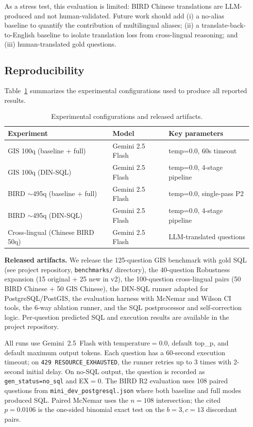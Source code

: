 \documentclass[11pt]{article}
\begin{document}
As a stress test, this evaluation is limited: BIRD Chinese translations are LLM-produced and not human-validated. Future work should add (i) a no-alias baseline to quantify the contribution of multilingual aliases; (ii) a translate-back-to-English baseline to isolate translation loss from cross-lingual reasoning; and (iii) human-translated gold questions.

\subsection{Reproducibility}

Table~\ref{tab:repro} summarizes the experimental configurations used to produce all reported results.

\begin{table}[t]
\centering
\caption{Experimental configurations and released artifacts.}
\label{tab:repro}
\begin{tabular}{lll}
\toprule
Experiment & Model & Key parameters \\
\midrule
GIS 100q (baseline + full) & Gemini 2.5 Flash & temp=0.0, 60s timeout \\
GIS 100q (DIN-SQL) & Gemini 2.5 Flash & temp=0.0, 4-stage pipeline \\
BIRD $\sim$495q (baseline + full) & Gemini 2.5 Flash & temp=0.0, single-pass P2 \\
BIRD $\sim$495q (DIN-SQL) & Gemini 2.5 Flash & temp=0.0, 4-stage pipeline \\
Cross-lingual (Chinese BIRD 50q) & Gemini 2.5 Flash & LLM-translated questions \\
\bottomrule
\end{tabular}
\end{table}

\noindent\textbf{Released artifacts.} We release the 125-question GIS benchmark with gold SQL (see project repository, \texttt{benchmarks/} directory), the 40-question Robustness expansion (15 original + 25 new in v2), the 100-question cross-lingual pairs (50 BIRD Chinese + 50 GIS Chinese), the DIN-SQL runner adapted for PostgreSQL/PostGIS, the evaluation harness with McNemar and Wilson CI tools, the 6-way ablation runner, and the SQL postprocessor and self-correction logic. Per-question predicted SQL and execution results are available in the project repository.

\noindent All runs use Gemini~2.5~Flash with temperature$=0.0$, default top\_p, and default maximum output tokens. Each question has a 60-second execution timeout; on \texttt{429 RESOURCE\_EXHAUSTED}, the runner retries up to 3 times with 2-second initial delay. On no-SQL output, the question is recorded as \texttt{gen\_status=no\_sql} and EX$=0$. The BIRD R2 evaluation uses 108 paired questions from \texttt{mini\_dev\_postgresql.json} where both baseline and full modes produced SQL. Paired McNemar uses the $n=108$ intersection; the cited $p=0.0106$ is the one-sided binomial exact test on the $b=3, c=13$ discordant pairs.
\end{document}
